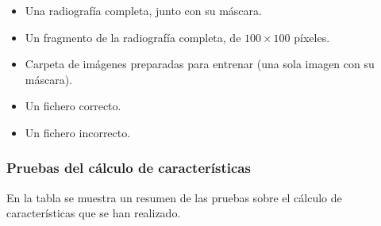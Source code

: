 \begin{itemize}
\item Una radiografía completa, junto con su máscara.
\item Un fragmento de la radiografía completa, de $100\times100$ píxeles.
\item Carpeta de imágenes preparadas para entrenar (una sola imagen con su máscara).
\item Un fichero \arff{} correcto.
\item Un fichero \arff{} incorrecto.
\end{itemize}

\subsubsection{Pruebas del cálculo de características}
En la tabla  se muestra un resumen de las pruebas sobre el cálculo de características que se han realizado.

